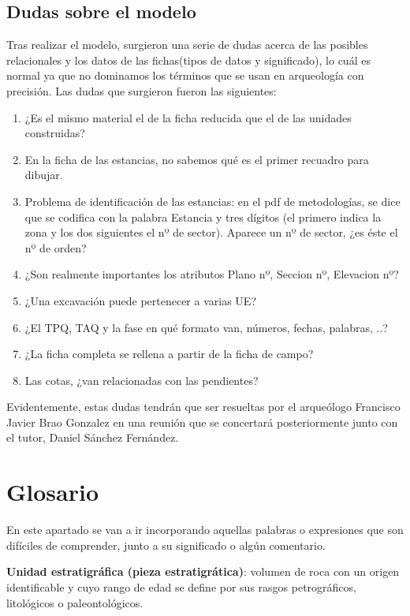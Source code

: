     \subsection{Dudas sobre el modelo}
    Tras realizar el modelo, surgieron una serie de dudas acerca de las posibles relacionales
    y los datos de las fichas(tipos de datos y significado), lo cuál es normal ya que no
    dominamos los términos que se usan en arqueología con precisión. Las dudas que surgieron
    fueron las siguientes:

        \begin{enumerate}
            \item ¿Es el mismo material el de la ficha reducida que el de las unidades
            construidas?
            \item En la ficha de las estancias, no sabemos qué es el primer recuadro para
            dibujar.
            \item Problema de identificación de las estancias: en el pdf de metodologías, 
            se dice que se codifica con la palabra Estancia y tres dígitos (el primero
            indica la zona y los dos siguientes el nº de sector). Aparece un nº de sector,
            ¿es éste el nº de orden?
            \item ¿Son realmente importantes los atributos Plano nº, Seccion nº, Elevacion
            nº?
            \item ¿Una excavación puede pertenecer a varias UE?
            \item ¿El TPQ, TAQ y la fase en qué formato van, números, fechas, palabras, ..?
            \item ¿La ficha completa se rellena a partir de la ficha de campo?
            \item Las cotas, ¿van relacionadas con las pendientes?
        \end{enumerate}

    Evidentemente, estas dudas tendrán que ser resueltas por el arqueólogo Francisco Javier
    Brao Gonzalez en una reunión que se concertará posteriormente junto con el tutor,
    Daniel Sánchez Fernández.

\section{Glosario}
En este apartado se van a ir incorporando aquellas palabras o expresiones que son difíciles
de comprender, junto a su significado o algún comentario.

\textbf{Unidad estratigráfica (pieza estratigrática)}: volumen de roca con un origen
identificable y cuyo rango de edad se define por sus rasgos petrográficos, litológicos o
paleontológicos.